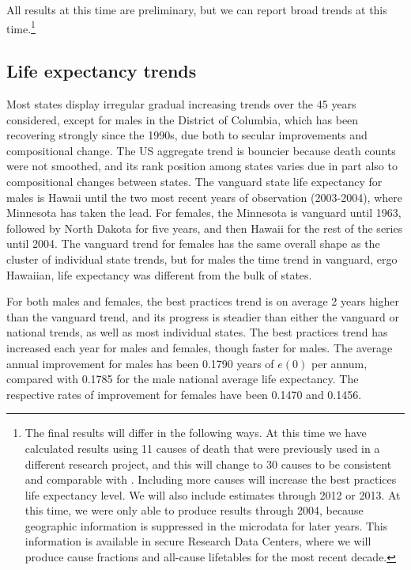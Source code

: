 \documentclass[11pt,oneside,a4paper]{article} %
\begin{document}
All results at this time are preliminary, but we can report broad trends at this
time.\footnote{The final results will differ in the following ways. At this time we have
calculated results using 11 causes of death that were previously used in a different research project, and this will
change to 30 causes to be consistent and comparable with \citet{vallin2008minimum}. Including
more causes will increase the best practices life expectancy level. We will also
include estimates through 2012 or 2013. At this time, we were only able to
produce results through 2004, because geographic information is suppressed in
the microdata for later years. This information is available in secure Research
Data Centers, where we will produce cause fractions and all-cause lifetables for
the most recent decade.} 

\subsection*{Life expectancy trends}
Most states display irregular gradual increasing trends
over the 45 years considered, except for males in the District of Columbia,
which has been recovering strongly since the 1990s, due both to secular
improvements and compositional change. The US aggregate trend is bouncier
because death counts were not smoothed, and its rank position among states
varies due in part also to compositional changes between states. The vanguard
state life expectancy for males is Hawaii until the two most recent years of
observation (2003-2004), where Minnesota has taken the lead. For females, the
Minnesota is vanguard until 1963, followed by North Dakota for five years, and
then Hawaii for the rest of the series until 2004. The vanguard trend for
females has the same overall shape as the cluster of individual state trends,
but for males the time trend in vanguard, ergo Hawaiian, life expectancy was
different from the bulk of states. 

For both males and females, the best
practices trend is on average 2 years higher than the vanguard trend, and its
progress is steadier than either the vanguard or national trends, as well as
most individual states. The best practices trend has increased each year for
males and females, though faster for males. The average annual improvement for
males has been 0.1790 years of $e(0)$ per annum, compared with 0.1785 for the
male national average life expectancy. The respective rates of improvement for
females have been 0.1470 and 0.1456.
\end{document}
